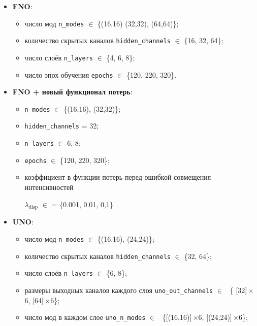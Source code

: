 \documentclass[12pt]{article}
\begin{document}
\begin{itemize}
  \item \textbf{FNO}:
    \begin{itemize}
      \item число мод \verb|n_modes| $\in$ \{(16,16) (32,32), (64,64)\};
      \item количество скрытых каналов \verb|hidden_channels| $\in$ \{16, 32, 64\};
      \item число слоёв \verb|n_layers| $\in$ \{4, 6, 8\};
      \item число эпох обучения \verb|epochs| $\in$ \{120, 220, 320\}.
    \end{itemize}

  \item \textbf{FNO + новый функционал потерь}:
    \begin{itemize}
      \item \verb|n_modes| $\in$ \{(16,16), (32,32)\};
      \item \verb|hidden_channels| = 32;
      \item \verb|n_layers| $\in$ {6, 8};
      \item \verb|epochs| $\in$ \{120, 220, 320\};

      \item коэффициент в функции потерь перед ошибкой совмещения интенсивностей 
      
      
      $\lambda_{\text{disp}}$ $\in$ = \{0.001, 0.01, 0,1\}
          
    \end{itemize}

  \item \textbf{UNO}:
    \begin{itemize}
      \item число мод \verb|n_modes| $\in$ \{(16,16), (24,24)\};
      \item количество скрытых каналов \verb|hidden_channels| $\in$ \{32, 64\};
      \item число слоёв \verb|n_layers| $\in$ \{6, 8\};
      \item размеры выходных каналов каждого слоя \verb|uno_out_channels| $\in$ \
      \{ [32]\,$\times$6, [64]\,$\times$6\};
      \item число мод в каждом слое \verb|uno_n_modes| $\in$ \
      \{[(16,16)]\,$\times$6, [(24,24)]\,$\times$6\};
    \end{itemize}
\end{itemize}
\end{document}
